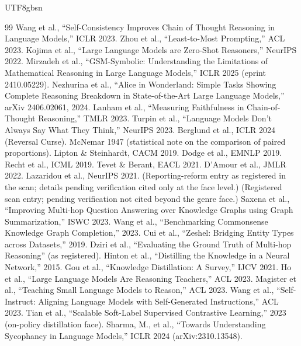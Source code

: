 \documentclass[11pt,letterpaper]{article}
\begin{document}
\begin{CJK}{UTF8}{gbsn}
\begin{thebibliography}{99}
 Wang et al., ``Self-Consistency Improves Chain of Thought Reasoning in Language Models,'' ICLR 2023.
 Zhou et al., ``Least-to-Most Prompting,'' ACL 2023.
 Kojima et al., ``Large Language Models are Zero-Shot Reasoners,'' NeurIPS 2022.
 Mirzadeh et al., ``GSM-Symbolic: Understanding the Limitations of Mathematical Reasoning in Large Language Models,'' ICLR 2025 (eprint 2410.05229).
 Nezhurina et al., ``Alice in Wonderland: Simple Tasks Showing Complete Reasoning Breakdown in State-of-the-Art Large Language Models,'' arXiv 2406.02061, 2024.
 Lanham et al., ``Measuring Faithfulness in Chain-of-Thought Reasoning,'' TMLR 2023.
 Turpin et al., ``Language Models Don't Always Say What They Think,'' NeurIPS 2023.
 Berglund et al., ICLR 2024 (Reversal Curse).
 McNemar 1947 (statistical note on the comparison of paired proportions).
 Lipton \& Steinhardt, CACM 2019.
 Dodge et al., EMNLP 2019.
 Recht et al., ICML 2019.
 Tevet \& Berant, EACL 2021.
 D'Amour et al., JMLR 2022.
 Lazaridou et al., NeurIPS 2021.
 (Reporting-reform entry as registered in the scan; details pending verification \textemdash{} cited only at the face level.)
 (Registered scan entry; pending verification \textemdash{} not cited beyond the genre face.)
 Saxena et al., ``Improving Multi-hop Question Answering over Knowledge Graphs using Graph Summarization,'' ISWC 2023.
 Wang et al., ``Benchmarking Commonsense Knowledge Graph Completion,'' 2023.
 Cui et al., ``Zeshel: Bridging Entity Types across Datasets,'' 2019.
 Dziri et al., ``Evaluating the Ground Truth of Multi-hop Reasoning'' (as registered).
 Hinton et al., ``Distilling the Knowledge in a Neural Network,'' 2015.
 Gou et al., ``Knowledge Distillation: A Survey,'' IJCV 2021.
 Ho et al., ``Large Language Models Are Reasoning Teachers,'' ACL 2023.
 Magister et al., ``Teaching Small Language Models to Reason,'' ACL 2023.
 Wang et al., ``Self-Instruct: Aligning Language Models with Self-Generated Instructions,'' ACL 2023.
 Tian et al., ``Scalable Soft-Label Supervised Contrastive Learning,'' 2023 (on-policy distillation face).
 Sharma, M., et al., ``Towards Understanding Sycophancy in Language Models,'' ICLR 2024 (arXiv:2310.13548).

\end{thebibliography}
\end{CJK}
\end{document}
